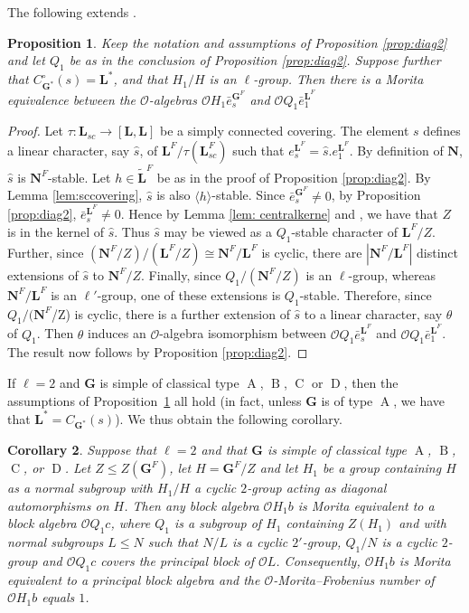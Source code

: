 \documentclass{amsart}
\theoremstyle{plain}\newtheorem{Theorem}{Theorem}[section]
\theoremstyle{plain}\newtheorem{Conjecture}[Theorem]{Conjecture}
\theoremstyle{plain}\newtheorem{Corollary}[Theorem]{Corollary}
\theoremstyle{plain}\newtheorem{Lemma}[Theorem]{Lemma}
\theoremstyle{plain}\newtheorem{Proposition}[Theorem]{Proposition}
\theoremstyle{definition}\newtheorem{Definition}[Theorem]{Definition}
\theoremstyle{definition}\newtheorem{Example}[Theorem]{Example}
\theoremstyle{definition}\newtheorem{Examples}[Theorem]{Examples}
\theoremstyle{definition}\newtheorem{Exercise}[Theorem]{Exercise}
\theoremstyle{definition}\newtheorem{Notation}[Theorem]{Notation}
\theoremstyle{definition}\newtheorem{Remark}[Theorem]{Remark}
\theoremstyle{definition}\newtheorem{Remarks}[Theorem]{Remarks}
\def\CO{{\mathcal{O}}}    \def\OPE{{\mathcal{O}(P\rtimes E)}}
\newcommand{\bG}{{\mathbf{G}}}
\newcommand{\bL}{{\mathbf{L}}}
\newcommand{\bN}{{\mathbf{N}}}
\newcommand{\type}{\operatorname}
\numberwithin{equation}{section}
\begin{document}
The following extends \cite[Ex.~7.9]{BDR}. 
\begin{Proposition} \label{example2}   Keep  the notation  and assumptions of Proposition \ref{prop:diag2}  and let $Q_1 $ be  as  in the  conclusion of Proposition \ref{prop:diag2}.  Suppose  further that  $C^{\circ}_{\bG^*}(s) =\bL^* $,  and   that  $H_1/H$  is   an $\ell$-group.  Then  there is  a Morita equivalence  between the $\CO$-algebras  $\CO H_1 \bar e_{s}^{\bG^F}$  and  $\CO Q_1 \bar e_1^{\bL^F} $
\end{Proposition} 

\begin{proof}  Let $\tau: \bL_{sc} \to [\bL, \bL]$  be a simply connected  covering. 
The element $s $ defines a linear character,  say $\hat s$, of $\bL^F/ \tau (\bL_{sc}^F)$  such that $e_s^{\bL^F} =\hat s. e_1^{\bL^F}$.  By definition  of $\bN$, $ \hat s $ is $\bN^F$-stable.   Let $ h  \in \tilde \bL^F$  be  as in  the proof of  Proposition \ref{prop:diag2}. By  Lemma \ref{lem:sccovering}, $ \hat s $  is also $\langle h \rangle $-stable.    Since $\bar e_s^{\bG^F}  \ne 0 $, by Proposition  \ref{prop:diag2}, $\bar e_s^{\bL^F} \ne 0 $. Hence by  Lemma \ref{lem: centralkerne}  and  \cite[Lem.~3.2]{FK}, we have that   $Z$  is  in the kernel of  $\hat s$. Thus $\hat s $  may be viewed as  a    $Q_1$-stable  character of $\bL^F/Z$. Further,  
  since $(\bN^F/Z) /(\bL^F/Z) \cong \bN^F/\bL^F $ is cyclic,  there are  $ |\bN^F/\bL^F| $  distinct  extensions of  $\hat s$    to $\bN^F/Z$. Finally, since $Q_1/ (\bN^F/Z) $ is an $\ell$-group,  whereas $\bN^F/\bL^F$  is an $\ell'$-group, one of these  extensions  is $Q_1$-stable. Therefore, since  $Q_1 /(\bN^F$/Z) is cyclic,   there  is a further extension  of $\hat s $  to a linear character, say $\theta$  of  $Q_1$.   Then $\theta $ induces an $\CO$-algebra isomorphism between $\CO  Q_1 \bar  e_{s}^{\bL^F}$ and $\CO  Q_1 \bar  e_1^{\bL^F}$.  The result now follows by Proposition \ref{prop:diag2}.
\end{proof}

 
If  $\ell=2 $  and  $\bG$   is simple  of   classical type   $\type{A}$, $\type{B}$, $\type{C}$ or $\type{D}$, then the assumptions of Proposition~\ref{example2}  all hold (in fact, unless  $\bG$ is of  type $\type{A}$, we have that $\bL^* = C_{\bG^*}(s) $). We  thus  obtain the following corollary.
\begin{Corollary}     Suppose that  $\ell=2 $ and that  $\bG$   is simple  of   classical type   $\type{A}$, $\type{B}$, $\type{C}$, or $\type{D}$.  
Let $Z \leq Z(\bG^F) $, let $H = \bG^F/Z$  and let $H_1 $  be  a   group containing  $H$  as  a normal  subgroup with $H_1/H$ a cyclic $2$-group acting as  diagonal automorphisms on $H$.   Then any block algebra  $\CO H_1b$   is Morita equivalent  to  a  block  algebra  $\CO Q_1c$, where  $Q_1$  is a  subgroup  of $H_1$  containing $Z(H_1) $   and with   normal  subgroups $L \leq  N $  such that  $N/L$ is a  cyclic  $2'$-group, $Q_1/N$  is a cyclic $2$-group  and  $ \CO Q_1c$ covers the principal block   of $\CO L$.   Consequently,  $\CO H_1b$ is Morita equivalent to  a principal block algebra and  the $\CO$-Morita--Frobenius number of   $ \CO H_1 b$   equals  $1$.     
\end{Corollary}
\end{document}
